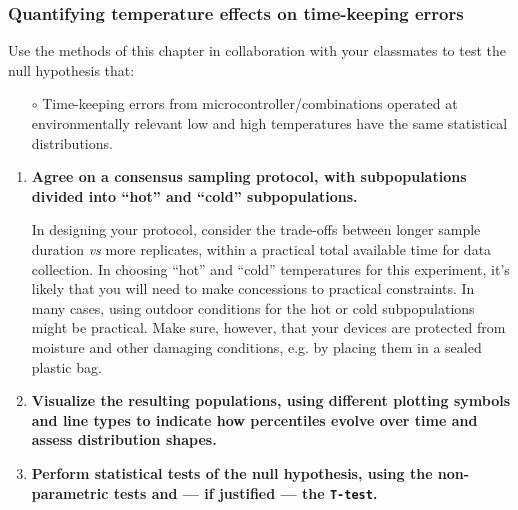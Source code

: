 \subsubsection{\howto Quantifying temperature effects on time-keeping errors}
Use the methods of this chapter in collaboration with your classmates to test the null hypothesis that:
\begin{itemize}
	\item[$\circ$] Time-keeping errors from microcontroller/\rtc combinations operated at environmentally relevant low and high temperatures have the same statistical distributions.
\end{itemize}
\begin{enumerate}
	\item \textbf{Agree on a consensus sampling protocol, with subpopulations divided into ``hot'' and ``cold'' subpopulations.}
	
	In designing your protocol, consider the trade-offs between longer sample duration \textit{vs} more replicates, within a practical total available time for data collection.
	In choosing ``hot'' and ``cold'' temperatures for this experiment, it's likely that you will need to make concessions to practical constraints.
	In many cases, using outdoor conditions for the hot or cold subpopulations might be practical.
	Make sure, however, that your devices are protected from moisture and other damaging conditions, e.g. by placing them in a sealed plastic bag. 
	
	\item \textbf{Visualize the resulting populations, using different plotting symbols and line types to indicate how percentiles evolve over time and assess distribution shapes.}
	\item \textbf{Perform statistical tests of the null hypothesis, using the non-parametric tests and --- if justified --- the \texttt{T-test}.}
	
	
\end{enumerate}



%
%
%



